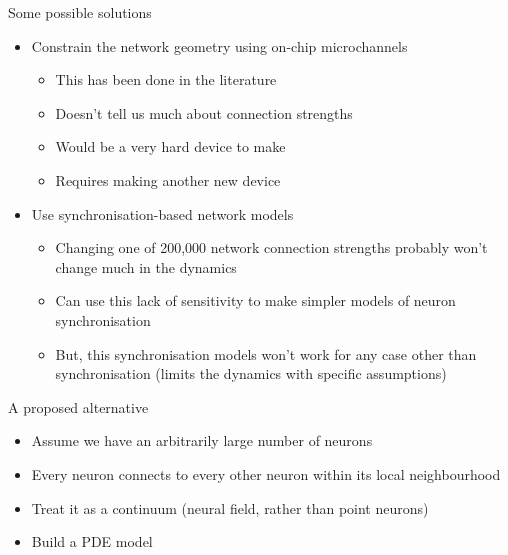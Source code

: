 \documentclass[presentation]{beamer}
\begin{document}
\begin{frame}[label={sec:orgb7527fa}]{Some possible solutions}
\begin{itemize}
\item Constrain the network geometry using on-chip microchannels
\begin{itemize}
\item This has been done in the literature
\item Doesn't tell us much about connection strengths
\item Would be a very hard device to make
\item Requires making another new device
\end{itemize}
\item Use synchronisation-based network models
\begin{itemize}
\item Changing one of 200,000 network connection strengths probably won't change much in the dynamics
\item Can use this lack of sensitivity to make simpler models of neuron synchronisation
\item But, this synchronisation models won't work for any case other than synchronisation (limits the dynamics with specific assumptions)
\end{itemize}
\end{itemize}
\end{frame}

\begin{frame}[label={sec:org4ec6c81}]{A proposed alternative}
\begin{itemize}
\item Assume we have an arbitrarily large number of neurons
\item Every neuron connects to every other neuron within its local neighbourhood
\item Treat it as a continuum (neural field, rather than point neurons)
\item Build a PDE model
\end{itemize}
\end{frame}
\end{document}
